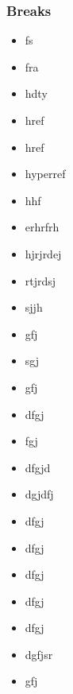 \begin{frame}[allowframebreaks]
    \frametitle{Breaks}
    \begin{itemize}
        \item fs
        \item fra
        \item hdty
        \item href
        \item href
        \item hyperref
        \item hhf
        \item erhrfrh
        \item hjrjrdej
        \item rtjrdsj
        \item sjjh
        \item gfj
        \item sgj
        \item gfj
        \item dfgj
        \item fgj
        \item dfgjd
        \item dgjdfj
        \item dfgj
        \item dfgj
        \item dfgj
        \item dfgj
        \item dfgj
        \item dgfjsr
        \item gfj
    \end{itemize}
\end{frame}